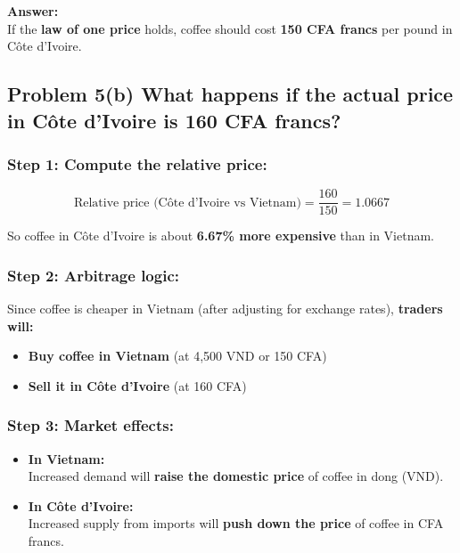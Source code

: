 \documentclass[
]{article}
\providecommand{\tightlist}{%
  \setlength{\itemsep}{0pt}\setlength{\parskip}{0pt}}
\begin{document}
\textbf{Answer:}\\
If the \textbf{law of one price} holds, coffee should cost \textbf{150
CFA francs} per pound in Côte d'Ivoire.

\subsection{Problem 5(b) What happens if the actual price in Côte
d'Ivoire is 160 CFA
francs?}\label{problem-5b-what-happens-if-the-actual-price-in-cuxf4te-divoire-is-160-cfa-francs}

\subsubsection{\texorpdfstring{Step 1: Compute the \textbf{relative
price}:}{Step 1: Compute the relative price:}}\label{step-1-compute-the-relative-price}

\[
\text{Relative price (Côte d’Ivoire vs Vietnam)} = \frac{160}{150} = 1.0667
\]

So coffee in Côte d'Ivoire is about \textbf{6.67\% more expensive} than
in Vietnam.

\subsubsection{Step 2: Arbitrage logic:}\label{step-2-arbitrage-logic}

Since coffee is cheaper in Vietnam (after adjusting for exchange rates),
\textbf{traders will:}

\begin{itemize}
\tightlist
\item
  \textbf{Buy coffee in Vietnam} (at 4,500 VND or 150 CFA)
\item
  \textbf{Sell it in Côte d'Ivoire} (at 160 CFA)
\end{itemize}

\subsubsection{Step 3: Market effects:}\label{step-3-market-effects}

\begin{itemize}
\item
  \textbf{In Vietnam:}\\
  Increased demand will \textbf{raise the domestic price} of coffee in
  dong (VND).
\item
  \textbf{In Côte d'Ivoire:}\\
  Increased supply from imports will \textbf{push down the price} of
  coffee in CFA francs.
\end{itemize}
\end{document}
